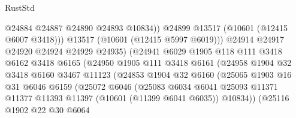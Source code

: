 \begin{lexlean}{RustStd}
\begin{coremodule}
                                    @24884
                                    @24887
                                    @24890
                                    @24893
                                    @10834))
                                @24899
                                @13517
                                (@10601 (@12415 @6007 @3418)))
                              @13517
                              (@10601 (@12415 @5997 @6019)))
                            @24914
                            @24917
                            @24920
                            @24924
                            @24929
                            @24935)
                          (@24941
                            @6029
                            @1905
                            @118
                            @111
                            @3418
                            @6162
                            @3418
                            @6165
                            (@24950
                              @1905
                              @111
                              @3418
                              @6161
                              (@24958
                                @1904
                                @32
                                @3418
                                @6160
                                @3467
                                @11123
                                (@24853
                                  @1904
                                  @32
                                  @6160
                                  (@25065
                                    @1903
                                    @16
                                    @31
                                    @6046
                                    @6159
                                    (@25072
                                      @6046
                                      (@25083
                                        @6034
                                        @6041
                                        @25093
                                        @11371
                                        @11377
                                        @11393
                                        @11397
                                        (@10601 (@11399 @6041 @6035))
                                        @10834))
                                    (@25116
                                      @1902
                                      @22
                                      @30
                                      @6064

\end{coremodule}
\end{lexlean}
